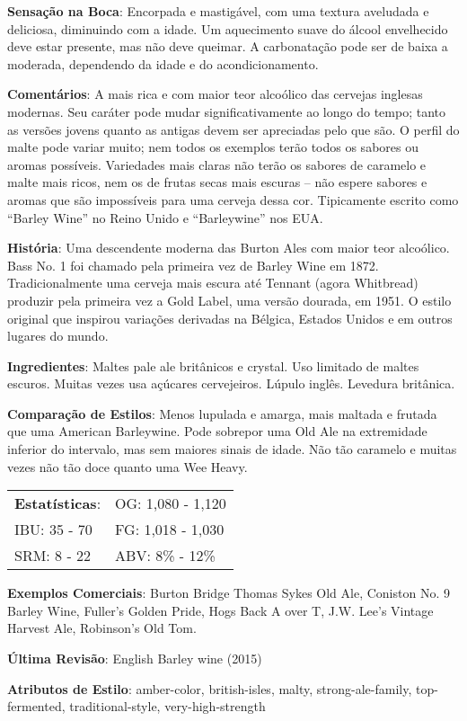 \textbf{Sensação na Boca}: Encorpada e mastigável, com uma textura aveludada e deliciosa, diminuindo com a idade. Um aquecimento suave do álcool envelhecido deve estar presente, mas não deve queimar. A carbonatação pode ser de baixa a moderada, dependendo da idade e do acondicionamento.

\textbf{Comentários}: A mais rica e com maior teor alcoólico das cervejas inglesas modernas. Seu caráter pode mudar significativamente ao longo do tempo; tanto as versões jovens quanto as antigas devem ser apreciadas pelo que são. O perfil do malte pode variar muito; nem todos os exemplos terão todos os sabores ou aromas possíveis. Variedades mais claras não terão os sabores de caramelo e malte mais ricos, nem os de frutas secas mais escuras – não espere sabores e aromas que são impossíveis para uma cerveja dessa cor. Tipicamente escrito como “Barley Wine” no Reino Unido e “Barleywine” nos EUA.

\textbf{História}: Uma descendente moderna das Burton Ales com maior teor alcoólico. Bass No. 1 foi chamado pela primeira vez de Barley Wine em 1872. Tradicionalmente uma cerveja mais escura até Tennant (agora Whitbread) produzir pela primeira vez a Gold Label, uma versão dourada, em 1951. O estilo original que inspirou variações derivadas na Bélgica, Estados Unidos e em outros lugares do mundo.

\textbf{Ingredientes}: Maltes pale ale britânicos e crystal. Uso limitado de maltes escuros. Muitas vezes usa açúcares cervejeiros. Lúpulo inglês. Levedura britânica.

\textbf{Comparação de Estilos}: Menos lupulada e amarga, mais maltada e frutada que uma American Barleywine. Pode sobrepor uma Old Ale na extremidade inferior do intervalo, mas sem maiores sinais de idade. Não tão caramelo e muitas vezes não tão doce quanto uma Wee Heavy.

\begin{tabular}{@{}p{35mm}p{35mm}@{}}
  \textbf{Estatísticas}: & OG: 1,080 - 1,120 \\
  IBU: 35 - 70  & FG: 1,018 - 1,030  \\
  SRM: 8 - 22  & ABV: 8\% - 12\%
\end{tabular}

\textbf{Exemplos Comerciais}: Burton Bridge Thomas Sykes Old Ale, Coniston No. 9 Barley Wine, Fuller’s Golden Pride, Hogs Back A over T, J.W. Lee’s Vintage Harvest Ale, Robinson’s Old Tom.

\textbf{Última Revisão}: English Barley wine (2015)


\textbf{Atributos de Estilo}: amber-color, british-isles, malty, strong-ale-family, top-fermented, traditional-style, very-high-strength
